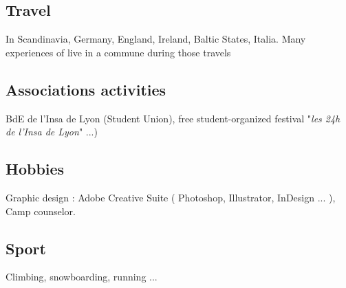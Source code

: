 	\subsection{Travel}
		{In Scandinavia, Germany, England, Ireland, Baltic States, Italia. Many experiences of live in a commune during those travels}
		
	\subsection{Associations activities}
		{BdE de l'Insa de Lyon (Student Union), free student-organized festival "\textit{les 24h de l'Insa de Lyon}" ...)}
		
	\subsection{Hobbies}
		{Graphic design : Adobe Creative Suite ( Photoshop, Illustrator, InDesign ... ),\\Camp counselor.}
		
	\subsection{Sport}
		{Climbing, snowboarding, running ...}
		

